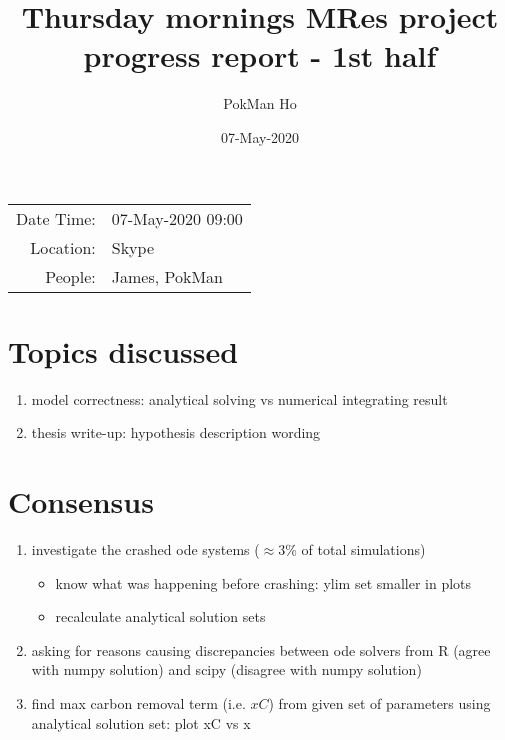 \documentclass[a4paper,11pt]{article}
\title{Thursday mornings MRes project progress report - 1st half}
\author{PokMan Ho}
\date{07-May-2020}
\begin{document}
    \maketitle
    
    \begin{tabular}{rl}
        Date Time: & 07-May-2020 09:00 \\
        Location: & Skype \\
        People: & James, PokMan \\
    \end{tabular}
    
    \section{Topics discussed}
    \begin{enumerate}
        \item model correctness: analytical solving vs numerical integrating result
        \item thesis write-up: hypothesis description wording
    \end{enumerate}
    
    \section{Consensus}
    \begin{enumerate}
        \item investigate the crashed ode systems ($\approx$3\% of total simulations)
        \begin{itemize}
            \item know what was happening before crashing: ylim set smaller in plots
            \item recalculate analytical solution sets
        \end{itemize}
        \item asking for reasons causing discrepancies between ode solvers from R (agree with numpy solution) and scipy (disagree with numpy solution)
        \item find max carbon removal term (i.e. $xC$) from given set of parameters using analytical solution set: plot xC vs x
    \end{enumerate}
\end{document}
